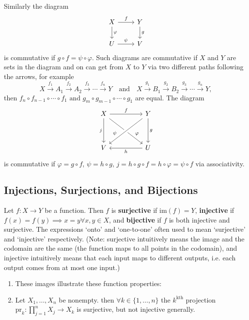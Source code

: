 Similarly the diagram
\[
    \begin{tikzcd}
        X \arrow{r}{f} \arrow{d}{\varphi} & Y \arrow{d}{g} \\
        U \arrow{r}{\psi} & V
    \end{tikzcd}
\]
is commutative if \(g \circ f = \psi\circ \varphi\). Such diagrams are commutative if \(X\) and \(Y\) are sets in the diagram and on can get from \(X\) to \(Y\) via two different paths following the arrows, for example
\[
    X \xrightarrow{f_1} A_1 \xrightarrow{f_2} A_2 \xrightarrow{f_3} \cdots \xrightarrow{f_n} Y \quad \text{and} \quad X \xrightarrow{g_1} B_1 \xrightarrow{g_2} B_2 \xrightarrow{g_3} \cdots \xrightarrow{g_n} Y,
\]
then \(f_n \circ f_{n-1} \circ \cdots \circ f_1 \text{ and } g_m \circ g_{m-1} \circ \cdots \circ g_1\) are equal. The diagram
\[
    \begin{tikzcd}
        X \arrow[dd, "j"']
        \arrow[rr, "f"]
        \arrow[rrdd, near end,"\varphi", bend right=0, shift left=0, crossing over]
        & &
        Y \arrow[lldd, "\psi"', bend left=0, shift right=0, crossing over, near end]
        \arrow[dd, "g"]
        \\
        & &
        \\
        V
        & &
        U \arrow[ll, "h",shift left=0]
    \end{tikzcd}
\]
is commutative if \(\varphi = g \circ f\), \(\psi = h \circ g\), \(j = h \circ g \circ f = h \circ \varphi = \psi \circ f\) via associativity.

\subsection{Injections, Surjections, and Bijections}
Let \(f : X \to Y\) be a function. Then \(f\) is \textbf{surjective} if \(\text{im}(f) = Y\), \textbf{injective} if \(f(x) = f(y) \implies x = y \forall x,y \in X\), and \textbf{bijective} if \(f\) is both injective and surjective. The expressions `onto' and `one-to-one' often used to mean `surjective' and `injective' respectively. (Note: surjective intuitively means the image and the codomain are the same (the function maps to all points in the codomain), and injective intuitively means that each input maps to different outputs, i.e. each output comes from at most one input.)

\begin{example}
    \begin{enumerate}[label=(\alph*)]
        \item These images illustrate these function properties:
            \begin{center}
                
            \end{center}

        \item Let $X_1,\dots, X_n$ be nonempty. then $\forall k \in \{1,\dots,n\}$ the $k^\text{kth}$ projection $\text{pr}_k : \prod_{j=1}^n X_j \to X_k$ is surjective, but not injective generally.
    \end{enumerate}
\end{example}

